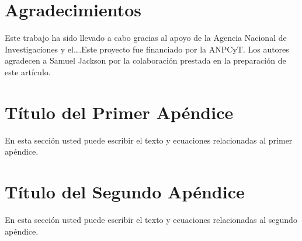 \documentclass[a4paper, 12pt]{article}
\begin{document}
\section*{Agradecimientos} %

Este trabajo ha sido llevado a cabo gracias al apoyo de la Agencia Nacional de Investigaciones y
el….Este proyecto fue financiado por la ANPCyT. Los autores agradecen a Samuel Jackson por la
colaboración prestada en la preparación de este artículo.

\appendix
\renewcommand\thesection{Apéndice \Alph{section}} %

\section{Título del Primer Apéndice}
En esta sección usted puede escribir el texto y ecuaciones relacionadas al primer apéndice.

\section{Título del Segundo Apéndice}
En esta sección usted puede escribir el texto y ecuaciones relacionadas al segundo apéndice.





\nocite{*} %

\printbibliography
\end{document}
